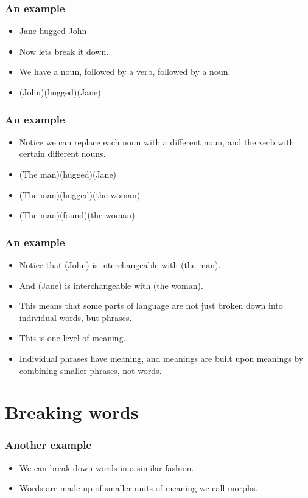 \documentclass{beamer}
\begin{document}
\begin{frame}
	\frametitle{An example}
	\begin{itemize}
	\item Jane hugged John
	\item Now lets break it down.
	\item We have a noun, followed by a verb, followed by a noun.
	\item (John)(hugged)(Jane)
	\end{itemize}


\end{frame}

\begin{frame}
	\frametitle{An example}
	\begin{itemize}
	\item Notice we can replace each noun with a different noun, and the verb with certain different nouns.
	\item (The man)(hugged)(Jane)
	\item (The man)(hugged)(the woman)
	\item (The man)(found)(the woman)
	\end{itemize}
\end{frame}

\begin{frame}
	\frametitle{An example}
	\begin{itemize}
		\item Notice that (John) is interchangeable with (the man).
		\item And (Jane) is interchangeable with (the woman).
		\item This means that some parts of language are not just broken down into individual words, but phrases.
		\item This is one level of meaning.
		\item Individual phrases have meaning, and meanings are built upon meanings by combining smaller phrases, not words.
	\end{itemize}
\end{frame}

\section{Breaking words}

\begin{frame}
	\frametitle{Another example}

	\begin{itemize}
	\item We can break down words in a similar fashion.
	\item Words are made up of smaller units of meaning we call morphs.
	

	\end{itemize}
\end{frame}
\end{document}
